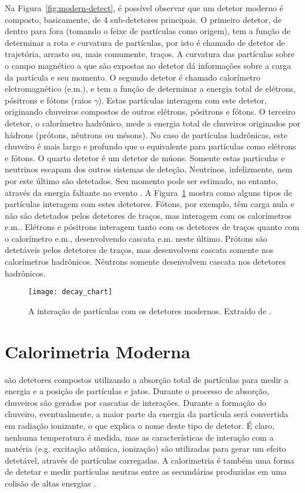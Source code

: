 Na Figura~\ref{fig:modern-detect}, é possível observar que um detetor moderno
é composto, basicamente, de 4 sub-detetores principais. O primeiro detetor, de
dentro para fora (tomando o feixe de partículas como origem), tem a função de
determinar a rota e curvatura de partículas, por isto é chamado de detetor de
trajetória, arrasto ou, mais comumente, traços. A curvatura das partículas
sobre o campo magnético a que são expostas no detetor dá informações sobre a
carga da partícula e seu momento. O segundo detetor é chamado calorímetro
eletromagnético (e.m.), e tem a função de determinar a energia total de
elétrons, pósitrons e fótons (raios $\gamma$). Estas partículas interagem com
este detetor, originando chuveiros compostos de outros elétrons, pósitrons e
fótons. O terceiro detetor, o calorímetro hadrônico, mede a energia total de
chuveiros originados por hádrons (prótons, nêutrons ou mésons). No caso de
partículas hadrônicas, este chuveiro é mais largo e profundo que o equivalente
para partículas como elétrons e fótons. O quarto detetor é um detetor de
múons. Somente estas partículas e neutrinos escapam dos outros sistemas de
deteção. Neutrinos, infelizmente, nem por este último são detetados. Seu
momento pode ser estimado, no entanto, através da energia faltante no evento
\cite{atlas-tp}. A Figura~\ref{fig:decay} mostra como alguns tipos de
partículas interagem com estes detetores. Fótons, por exemplo, têm carga nula
e não são detetados pelos detetores de traços, mas interagem com os
calorímetros e.m.. Elétrons e pósitrons interagem tanto com os detetores de
traços quanto com o calorímetro e.m., desenvolvendo cascata e.m. neste
último. Prótons são detetáveis pelos detetores de traços, mas desenvolvem
cascata somente nos calorímetros hadrônicos. Nêutrons somente desenvolvem
cascata nos detetores hadrônicos.

\begin{figure}
\begin{center}
\texttt{[image: decay\_chart]}
\end{center}
\caption{A interação de partículas com os detetores modernos. Extraído de
\cite{partadv}.} 
\label{fig:decay}
\end{figure}

\section{Calorimetria Moderna}
\label{sec:calorimetria}

 são detetores compostos utilizando a absorção
total de partículas para medir a energia e a posição de partículas e
jatos. Durante o processo de absorção, chuveiros são gerados por cascatas de
interações. Durante a formação do chuveiro, eventualmente, a maior parte da
energia da partícula será convertida em radiação ionizante, o que explica o nome
deste tipo de detetor. É claro, nenhuma temperatura é medida, mas as
características de interação com a matéria (e.g. excitação atômica, ionização)
são utilizadas para gerar um efeito detetável, através de partículas
carregadas. A calorimetria é também uma forma de detetar e medir partículas
neutras entre as secundárias produzidas em uma colisão de altas energias
\cite{bock:detector}.

